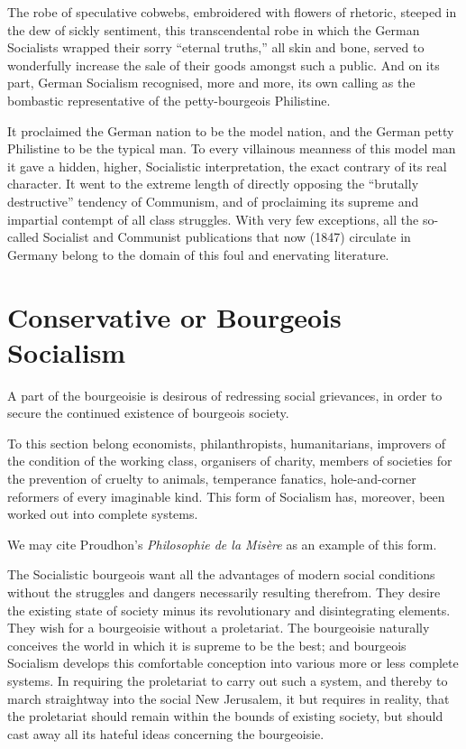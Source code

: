 The robe of speculative cobwebs, embroidered with flowers of rhetoric,
steeped in the dew of sickly sentiment, this transcendental robe in
which the German Socialists wrapped their sorry \enquote{eternal truths,} all
skin and bone, served to wonderfully increase the sale of their goods
amongst such a public. And on its part, German Socialism recognised,
more and more, its own calling as the bombastic representative of the
petty-bourgeois Philistine.

It proclaimed the German nation to be the model nation, and the German
petty Philistine to be the typical man. To every villainous meanness of
this model man it gave a hidden, higher, Socialistic interpretation,
the exact contrary of its real character. It went to the extreme length
of directly opposing the \enquote{brutally destructive} tendency of Communism,
and of proclaiming its supreme and impartial contempt of all class
struggles. With very few exceptions, all the so-called Socialist and
Communist publications that now (1847) circulate in Germany belong to
the domain of this foul and enervating literature.

\section*{Conservative or Bourgeois Socialism}
A part of the bourgeoisie is desirous of redressing social grievances,
in order to secure the continued existence of bourgeois society.

To this section belong economists, philanthropists, humanitarians,
improvers of the condition of the working class, organisers of charity,
members of societies for the prevention of cruelty to animals,
temperance fanatics, hole-and-corner reformers of every imaginable
kind. This form of Socialism has, moreover, been worked out into
complete systems.

We may cite Proudhon’s \textit{Philosophie de la Misère} as an example of this
form.

The Socialistic bourgeois want all the advantages of modern social
conditions without the struggles and dangers necessarily resulting
therefrom. They desire the existing state of society minus its
revolutionary and disintegrating elements. They wish for a bourgeoisie
without a proletariat. The bourgeoisie naturally conceives the world in
which it is supreme to be the best; and bourgeois Socialism develops
this comfortable conception into various more or less complete systems.
In requiring the proletariat to carry out such a system, and thereby to
march straightway into the social New Jerusalem, it but requires in
reality, that the proletariat should remain within the bounds of
existing society, but should cast away all its hateful ideas concerning
the bourgeoisie.

